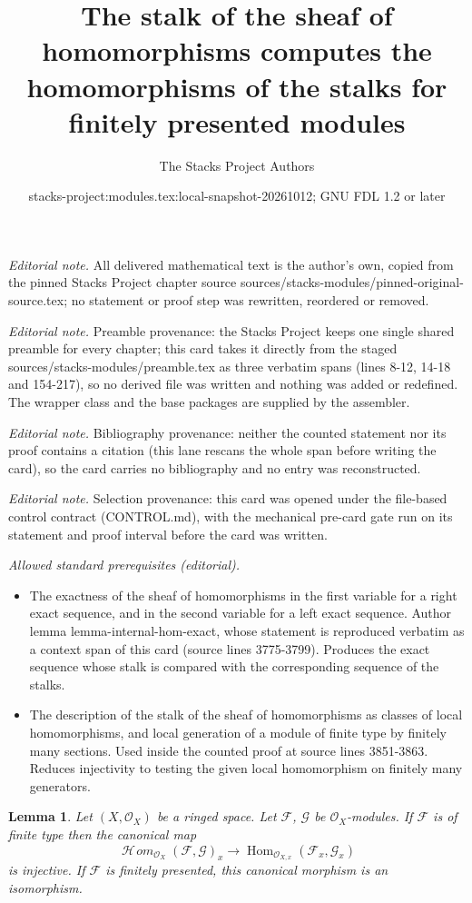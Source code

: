 \documentclass[10pt,a4paper]{amsart}
\title{The stalk of the sheaf of homomorphisms computes the homomorphisms of the stalks for finitely presented modules}
\author{The Stacks Project Authors}
\date{stacks-project:modules.tex:local-snapshot-20261012; GNU FDL 1.2 or later}
\theoremstyle{plain}
\newtheorem{lemma}[subsection]{Lemma}
\theoremstyle{definition}
\theoremstyle{remark}
\numberwithin{equation}{subsection}
\def\Hom{\mathop{\mathrm{Hom}}\nolimits}
\def\SheafHom{\mathop{\mathcal{H}\!\mathit{om}}\nolimits}
\begin{document}
\maketitle
\noindent\textit{Editorial note.} All delivered mathematical text is the author's own, copied from the pinned Stacks Project chapter source sources/stacks-modules/pinned-original-source.tex; no statement or proof step was rewritten, reordered or removed.\par\medskip
\noindent\textit{Editorial note.} Preamble provenance: the Stacks Project keeps one single shared preamble for every chapter; this card takes it directly from the staged sources/stacks-modules/preamble.tex as three verbatim spans (lines 8-12, 14-18 and 154-217), so no derived file was written and nothing was added or redefined. The wrapper class and the base packages are supplied by the assembler.\par\medskip
\noindent\textit{Editorial note.} Bibliography provenance: neither the counted statement nor its proof contains a citation (this lane rescans the whole span before writing the card), so the card carries no bibliography and no entry was reconstructed.\par\medskip
\noindent\textit{Editorial note.} Selection provenance: this card was opened under the file-based control contract (CONTROL.md), with the mechanical pre-card gate run on its statement and proof interval before the card was written.\par\medskip
\noindent\textit{Allowed standard prerequisites (editorial).}\begin{itemize}
\item The exactness of the sheaf of homomorphisms in the first variable for a right exact sequence, and in the second variable for a left exact sequence. Author lemma lemma-internal-hom-exact, whose statement is reproduced verbatim as a context span of this card (source lines 3775-3799). Produces the exact sequence whose stalk is compared with the corresponding sequence of the stalks.
\item The description of the stalk of the sheaf of homomorphisms as classes of local homomorphisms, and local generation of a module of finite type by finitely many sections. Used inside the counted proof at source lines 3851-3863. Reduces injectivity to testing the given local homomorphism on finitely many generators.
\end{itemize}\medskip
\begin{lemma}
\label{lemma-stalk-internal-hom}
Let $(X, \mathcal{O}_X)$ be a ringed space.
Let $\mathcal{F}$, $\mathcal{G}$ be $\mathcal{O}_X$-modules.
If $\mathcal{F}$ is of finite type then the canonical map
$$
\SheafHom_{\mathcal{O}_X}(\mathcal{F}, \mathcal{G})_x
\to
\Hom_{\mathcal{O}_{X, x}}(\mathcal{F}_x, \mathcal{G}_x)
$$
is injective.
If $\mathcal{F}$ is finitely presented,
this canonical morphism is an isomorphism.
\end{lemma}
\end{document}

